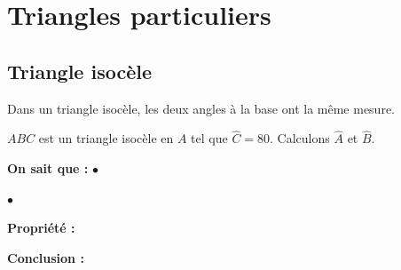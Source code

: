 \documentclass[a4paper,10pt]{report}
\begin{document}
\section{Triangles particuliers}

\subsection{Triangle isocèle}

\begin{prop}
Dans un triangle isocèle, les deux angles à la base ont la même mesure.
\end{prop}

\begin{ex}
$ABC$ est un triangle isocèle en $A$ tel que $\widehat{C} = 80$\degre . Calculons $\widehat{A}$ et $\widehat{B}$.

\medskip
\noindent \begin{minipage}{12cm}

\medskip
\noindent \textbf{On sait que :} \hspace{6.7mm}$\bullet$ \dotfill \medskip \medskip%

\hspace{2.5cm} $\bullet$ \dotfill \medskip %

\medskip
\noindent \textbf{Propriété :} \dotfill \medskip \medskip

\dotfill \medskip%

\medskip
\noindent \textbf{Conclusion :} 


\end{minipage}
\end{ex}
\end{document}
